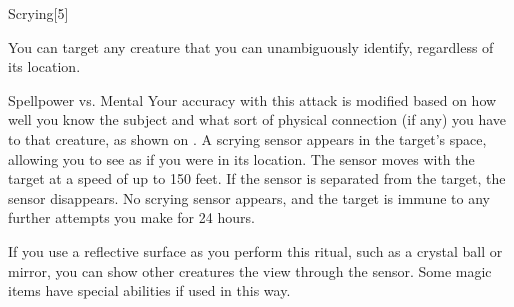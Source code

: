 \begin{spellsection}{Scrying}[5]
    \begin{spellheader}
    \end{spellheader}
    \begin{spellcontent}
        \begin{spelltargetinginfo}
            \spellspecial You can target any creature that you can unambiguously identify, regardless of its location.
        \end{spelltargetinginfo}
        \begin{spelleffects}
            \begin{spellattack}{Spellpower vs. Mental}
                \spellspecial Your accuracy with this attack is modified based on how well you know the subject and what sort of physical connection (if any) you have to that creature, as shown on .
                \spellsuccess A scrying sensor appears in the target's space, allowing you to see as if you were in its location. The sensor moves with the target at a speed of up to 150 feet. If the sensor is separated from the target, the sensor disappears.
                \spellfailure No scrying sensor appears, and the target is immune to any further attempts you make for 24 hours.
            \end{spellattack}
            \spelldur \durmed \dismissable
        \end{spelleffects}
    \end{spellcontent}
    \begin{spellfooter}
        \spellnotes \sensorspellnotes
        \spellnotes If you use a reflective surface as you perform this ritual, such as a crystal ball or mirror, you can show other creatures the view through the sensor. Some magic items have special abilities if used in this way.
    \end{spellfooter}
    \begin{spellaugments}
    \end{spellaugments}
\end{spellsection}
